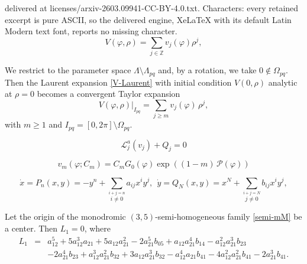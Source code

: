 \documentclass[10pt,a4paper]{amsart}
\begin{document}
delivered at licenses/arxiv-2603.09941-CC-BY-4.0.txt. Characters: every retained excerpt is pure ASCII, so the delivered engine, XeLaTeX with its default Latin Modern text font, reports no missing character.
\begin{equation}\label{V-Laurent}
V(\varphi, \rho) = \sum_{j \in \mathbb{Z}} v_j(\varphi) \rho^{j},
\end{equation}

\begin{theorem} \label{teo-Pi-Algorithm}
We restrict to the parameter space $\Lambda \setminus \Lambda_{pq}$ and, by a rotation, we take $0 \not\in \Omega_{pq}$. Then the Laurent expansion \eqref{V-Laurent} with initial condition $V(0, \rho)$ analytic at $\rho=0$ becomes a convergent Taylor expansion
\begin{equation}\label{Taylor-V}
V(\varphi, \rho) \Big|_{I_{pq}} = \sum_{j \ge m} v_j(\varphi) \, \rho^j,
\end{equation}
with $m \geq 1$ and $I_{pq} = [0, 2 \pi] \setminus \Omega_{pq}$.
\end{theorem}

\begin{equation}\label{edo-para-vj}
\mathcal{L}^{a}_j(v_j) + Q_j = 0
\end{equation}

\begin{equation}\label{vm-explicit}
v_m(\varphi; C_m) = C_m G_0(\varphi) \exp\left( (1-m) \, \mathcal{P}(\varphi) \right)
\end{equation}

\begin{equation}\label{semi-mM}
\dot{x} = P_n(x,y) = -y^n + \sum_{\stackrel{i+j=n}{\scriptscriptstyle i \neq 0}} a_{ij} x^i y^j, \ \ \dot{y} = Q_N(x,y) = x^N + \sum_{\stackrel{i+j=N}{\scriptscriptstyle j \neq 0}} b_{ij} x^i y^j,
\end{equation}

\begin{proposition}\label{prop-seihomo-35}
Let the origin of the monodromic $(3, 5)$-semi-homogeneous family \eqref{semi-mM} be a center. Then $L_1 = 0$, where
\begin{eqnarray*}
L_1 &=& a_{12}^5 + 5 a_{12}^3 a_{21} + 5 a_{12} a_{21}^2 - 2 a_{21}^5 b_{05} + a_{12} a_{21}^4 b_{14} -  a_{12}^2 a_{21}^3 b_{23} \\
 &  & - 2 a_{21}^4 b_{23} + a_{12}^3 a_{21}^2 b_{32} + 3 a_{12} a_{21}^3 b_{32} -
 a_{12}^4 a_{21} b_{41} - 4 a_{12}^2 a_{21}^2 b_{41} -
 2 a_{21}^3 b_{41}.
\end{eqnarray*}
\end{proposition}
\end{document}
